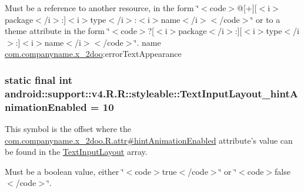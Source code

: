 Must be a reference to another resource, in the form \char`\"{}$<$code$>$@\mbox{[}+\mbox{]}\mbox{[}$<$i$>$package$<$/i$>$:\mbox{]}$<$i$>$type$<$/i$>$:$<$i$>$name$<$/i$>$$<$/code$>$\char`\"{} or to a theme attribute in the form \char`\"{}$<$code$>$?\mbox{[}$<$i$>$package$<$/i$>$:\mbox{]}\mbox{[}$<$i$>$type$<$/i$>$:\mbox{]}$<$i$>$name$<$/i$>$$<$/code$>$\char`\"{}.  name \hyperlink{namespacecom_1_1companyname_1_1x__2doo}{com.companyname.x\_\-2doo}:errorTextAppearance \hypertarget{classandroid_1_1support_1_1v4_1_1_r_1_1styleable_13f535700725e41671bac1815f26fc74}{
\subsubsection[{TextInputLayout\_\-hintAnimationEnabled}]{\setlength{\rightskip}{0pt plus 5cm}static final int android::support::v4.R.R::styleable::TextInputLayout\_\-hintAnimationEnabled = 10}}
\label{classandroid_1_1support_1_1v4_1_1_r_1_1styleable_13f535700725e41671bac1815f26fc74}


This symbol is the offset where the \hyperlink{classcom_1_1companyname_1_1x__2doo_1_1_r_1_1attr_54192e5bf6506b5933feec17a73c2b76}{com.companyname.x\_\-2doo.R.attr\#hintAnimationEnabled} attribute's value can be found in the \hyperlink{classandroid_1_1support_1_1v4_1_1_r_1_1styleable_880beb171ce483ab1b63a82ef7f9d976}{TextInputLayout} array.

Must be a boolean value, either \char`\"{}$<$code$>$true$<$/code$>$\char`\"{} or \char`\"{}$<$code$>$false$<$/code$>$\char`\"{}. 

